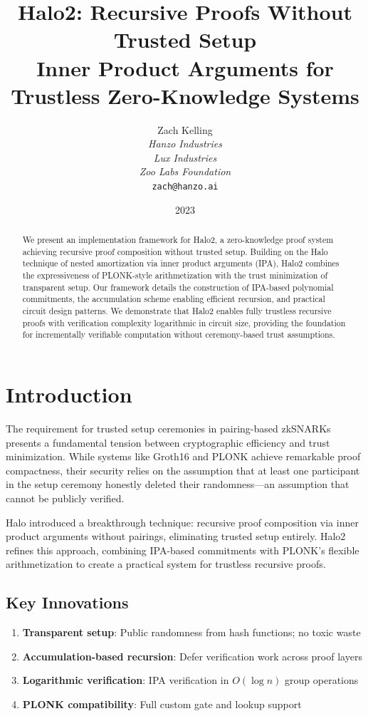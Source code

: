 \documentclass[11pt,a4paper]{article}
\title{Halo2: Recursive Proofs Without Trusted Setup\\
Inner Product Arguments for Trustless Zero-Knowledge Systems}
\author{Zach Kelling\\
\textit{Hanzo Industries}\\
\textit{Lux Industries}\\
\textit{Zoo Labs Foundation}\\
\texttt{zach@hanzo.ai}}
\date{2023}
\begin{document}
\maketitle

\begin{abstract}
We present an implementation framework for Halo2, a zero-knowledge proof system achieving recursive proof composition without trusted setup. Building on the Halo technique of nested amortization via inner product arguments (IPA), Halo2 combines the expressiveness of PLONK-style arithmetization with the trust minimization of transparent setup. Our framework details the construction of IPA-based polynomial commitments, the accumulation scheme enabling efficient recursion, and practical circuit design patterns. We demonstrate that Halo2 enables fully trustless recursive proofs with verification complexity logarithmic in circuit size, providing the foundation for incrementally verifiable computation without ceremony-based trust assumptions.
\end{abstract}

\section{Introduction}

The requirement for trusted setup ceremonies in pairing-based zkSNARKs presents a fundamental tension between cryptographic efficiency and trust minimization. While systems like Groth16 and PLONK achieve remarkable proof compactness, their security relies on the assumption that at least one participant in the setup ceremony honestly deleted their randomness---an assumption that cannot be publicly verified.

Halo \cite{halo} introduced a breakthrough technique: recursive proof composition via inner product arguments without pairings, eliminating trusted setup entirely. Halo2 \cite{halo2} refines this approach, combining IPA-based commitments with PLONK's flexible arithmetization to create a practical system for trustless recursive proofs.

\subsection{Key Innovations}

\begin{enumerate}[label=(\roman*)]
    \item \textbf{Transparent setup}: Public randomness from hash functions; no toxic waste
    \item \textbf{Accumulation-based recursion}: Defer verification work across proof layers
    \item \textbf{Logarithmic verification}: IPA verification in $O(\log n)$ group operations
    \item \textbf{PLONK compatibility}: Full custom gate and lookup support
\end{enumerate}
\end{document}
